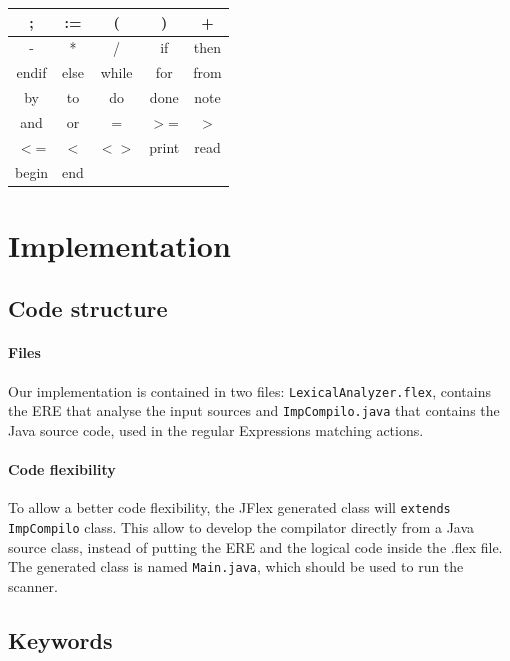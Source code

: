 \documentclass[letterpaper]{article}
\begin{document}
\begin{tabular}{|c|c|c|c|c|}
    \hline
    ; & := & ( & )  & + \\
    \hline
    - & *  & / & if & then \\
    \hline
    endif & else & while & for & from \\
    \hline
    by & to & do & done & note \\
    \hline
    and & or & = & $>$= & $>$ \\
    \hline
    $<$= & $<$ & $<>$ & print & read \\
    \hline
    begin & end & & &  \\
    \hline
\end{tabular}



\section{Implementation}

\subsection{Code structure}

\paragraph{Files}

Our implementation is contained in two files: \texttt{LexicalAnalyzer.flex},
contains the ERE that analyse the input sources and \texttt{ImpCompilo.java}
that contains the Java source code, used in the regular Expressions
matching actions.


\paragraph{Code flexibility}

To allow a better code flexibility, the JFlex generated class will
\texttt{extends} \texttt{ImpCompilo} class. This allow to develop the
compilator directly from a Java source class, instead of putting the
ERE and the logical code inside the .flex file. The generated class is named
\texttt{Main.java}, which should be used to run the scanner.

\subsection{Keywords}

\label{impl-keywords}
\end{document}
